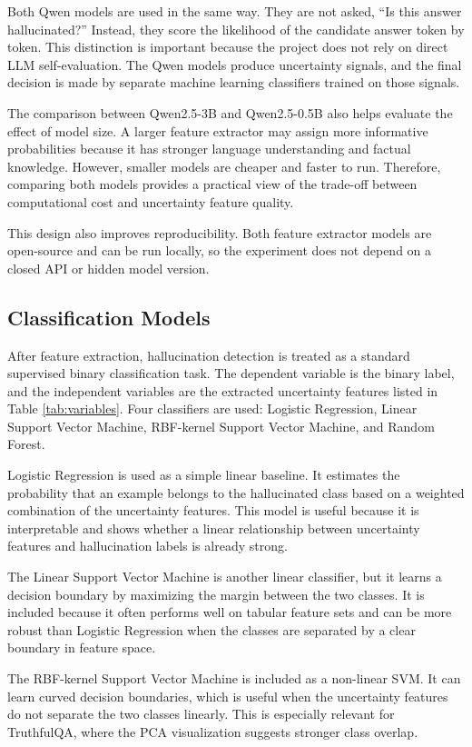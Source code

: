 \documentclass[11pt]{article}
\begin{document}
Both Qwen models are used in the same way. They are not asked, ``Is this answer hallucinated?'' Instead, they score the likelihood of the candidate answer token by token. This distinction is important because the project does not rely on direct LLM self-evaluation. The Qwen models produce uncertainty signals, and the final decision is made by separate machine learning classifiers trained on those signals.

The comparison between Qwen2.5-3B and Qwen2.5-0.5B also helps evaluate the effect of model size. A larger feature extractor may assign more informative probabilities because it has stronger language understanding and factual knowledge. However, smaller models are cheaper and faster to run. Therefore, comparing both models provides a practical view of the trade-off between computational cost and uncertainty feature quality.

This design also improves reproducibility. Both feature extractor models are open-source and can be run locally, so the experiment does not depend on a closed API or hidden model version.

\subsection{Classification Models}
After feature extraction, hallucination detection is treated as a standard supervised binary classification task. The dependent variable is the binary label, and the independent variables are the extracted uncertainty features listed in Table \ref{tab:variables}. Four classifiers are used: Logistic Regression, Linear Support Vector Machine, RBF-kernel Support Vector Machine, and Random Forest.

Logistic Regression is used as a simple linear baseline. It estimates the probability that an example belongs to the hallucinated class based on a weighted combination of the uncertainty features. This model is useful because it is interpretable and shows whether a linear relationship between uncertainty features and hallucination labels is already strong.

The Linear Support Vector Machine is another linear classifier, but it learns a decision boundary by maximizing the margin between the two classes. It is included because it often performs well on tabular feature sets and can be more robust than Logistic Regression when the classes are separated by a clear boundary in feature space.

The RBF-kernel Support Vector Machine is included as a non-linear SVM. It can learn curved decision boundaries, which is useful when the uncertainty features do not separate the two classes linearly. This is especially relevant for TruthfulQA, where the PCA visualization suggests stronger class overlap.
\end{document}
